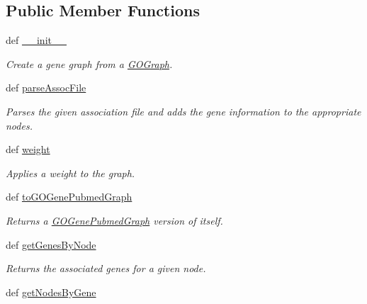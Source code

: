 \subsection*{Public Member Functions}
\begin{DoxyCompactItemize}
\item 
def \hyperlink{class_g_o_gene_graph_1_1_g_o_gene_graph_a37f579f2fd7c2e8f0e52345e5c94233f}{\_\-\_\-init\_\-\_\-}
\begin{DoxyCompactList}\small\item\em Create a gene graph from a \hyperlink{namespace_g_o_graph}{GOGraph}. \item\end{DoxyCompactList}\item 
def \hyperlink{class_g_o_gene_graph_1_1_g_o_gene_graph_a0881964964972853c93e7606b73bb825}{parseAssocFile}
\begin{DoxyCompactList}\small\item\em Parses the given association file and adds the gene information to the appropriate nodes. \item\end{DoxyCompactList}\item 
def \hyperlink{class_g_o_gene_graph_1_1_g_o_gene_graph_a276c7e223374b8c22417e195afacffed}{weight}
\begin{DoxyCompactList}\small\item\em Applies a weight to the graph. \item\end{DoxyCompactList}\item 
def \hyperlink{class_g_o_gene_graph_1_1_g_o_gene_graph_a5f437c2ab06eacde21831786192c4a4e}{toGOGenePubmedGraph}
\begin{DoxyCompactList}\small\item\em Returns a \hyperlink{namespace_g_o_gene_pubmed_graph}{GOGenePubmedGraph} version of itself. \item\end{DoxyCompactList}\item 
def \hyperlink{class_g_o_gene_graph_1_1_g_o_gene_graph_a778128e77640d18bcaf775c2348013d4}{getGenesByNode}
\begin{DoxyCompactList}\small\item\em Returns the associated genes for a given node. \item\end{DoxyCompactList}\item 
def \hyperlink{class_g_o_gene_graph_1_1_g_o_gene_graph_a353497bb1605cfbefba350861e81ea6e}{getNodesByGene}

\end{DoxyCompactItemize}
